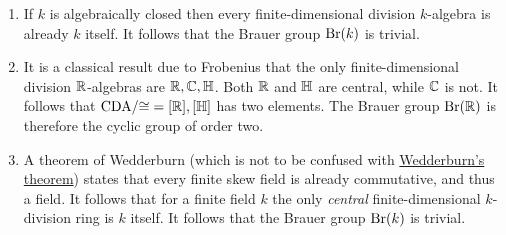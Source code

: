 \begin{example}
  \leavevmode
  \begin{enumerate}
    \item
      If $k$ is algebraically closed then every finite-dimensional division $k$-algebra is already $k$ itself.
      It follows that the Brauer group $\operatorname{Br}(k)$ is trivial.
    \item
      It is a classical result due to Frobenius that the only finite-dimensional division $\mathbb{R}$-algebras are $\mathbb{R}, \mathbb{C}, \mathbb{H}$.
      Both $\mathbb{R}$ and $\mathbb{H}$ are central, while $\mathbb{C}$ is not.
      It follows that $\operatorname{CDA}\!/{\cong} = {[\mathbb{R}], [\mathbb{H}]}$ has two elements.
      The Brauer group $\operatorname{Br}(\mathbb{R})$ is therefore the cyclic group of order two.
    \item
      A theorem of Wedderburn (which is not to be confused with \hyperref[theorem: wedderburns theorem]{Wedderburn’s theorem}) states that every finite skew field is already commutative, and thus a field.
      It follows that for a finite field $k$ the only \emph{central} finite-dimensional $k$-division ring is $k$ itself.
      It follows that the Brauer group $\operatorname{Br}(k)$ is trivial.
  \end{enumerate}
\end{example}





